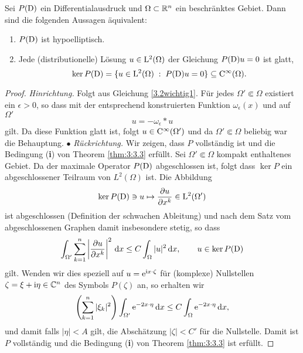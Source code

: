 %
%
%
%

\begin{thm}
Sei $P(\mathrm D)$ ein Differentialausdruck und $\Omega\subset\mathbb R^n$ ein beschränktes Gebiet. Dann sind die folgenden Aussagen äquivalent:
\begin{enumerate}
\item $P(\mathrm D)$ ist hypoelliptisch.
\item Jede (distributionelle) Lösung $u\in\mathrm L^2(\Omega)$ der Gleichung $P(\mathrm D)u=0$ ist glatt,
\begin{equation}
    \ker P(\mathrm D) = \{ u\in\mathrm L^2(\Omega) \;:\; P(\mathrm D)u=0\} \subseteq\mathrm C^\infty(\Omega).
\end{equation}
\end{enumerate}
\end{thm}
\begin{proof}
\emph{Hinrichtung.} Folgt aus Gleichung \eqref{3.2wichtig1}. Für jedes $\Omega'\Subset\Omega$ existiert ein $\epsilon>0$, so dass mit der entsprechend konstruierten Funktion $\omega_\epsilon(x)$ und auf $\Omega'$
\begin{equation}
 u = - \omega_\epsilon*u 
\end{equation}
gilt. Da diese Funktion glatt ist, folgt $u\in\mathrm C^\infty(\Omega')$ und da $\Omega'\Subset\Omega$ beliebig war die Behauptung. $\bullet$ \qquad
\emph{Rückrichtung.} Wir zeigen, dass $P$ vollständig ist und die Bedingung ({\bf i}) von Theorem \ref{thm:3:3.3} erfüllt.   Sei $\Omega'\Subset \Omega$ kompakt enthaltenes Gebiet. Da der maximale Operator $P(\mathrm D)$  abgeschlossen ist, folgt dass $\ker P$ ein abgeschlossener Teilraum von $L^2(\Omega)$ ist. Die Abbildung
\begin{equation}
\ker P(\mathrm D)\ni u \mapsto \frac{\partial u}{\partial x^k} \in \mathrm L^2(\Omega')
\end{equation}  
ist abgeschlossen (Definition der schwachen Ableitung) und nach dem Satz vom abgeschlossenen Graphen damit insbesondere stetig, so dass
\begin{equation}
\int_{\Omega'} \sum_{k=1}^n \left | \frac{\partial u}{\partial x^k}\right |^2\,\mathrm d x \le C \int_\Omega |u|^2\,\mathrm d x, \qquad u\in \ker P(\mathrm D)
\end{equation}
gilt. Wenden wir dies speziell auf $u=\mathrm e^{\mathrm i x\cdot \zeta}$ für (komplexe) Nullstellen $\zeta=\xi+\mathrm i\eta\in\mathbb C^n$ des Symbols $P(\zeta)$ an,  so erhalten wir
\begin{equation}
\left (\sum_{k=1}^n |\xi_k|^2 \right ) \int_{\Omega'} \mathrm e^{-2x\cdot \eta}\,\mathrm d x \le C\int_\Omega \mathrm e^{-2 x\cdot \eta}\,\mathrm d x,
\end{equation}
und damit falls  $|\eta|<A$ gilt, die Abschätzung $|\zeta|<C'$ für die Nullstelle. Damit ist $P$ vollständig und die Bedingung ({\bf i}) von Theorem \ref{thm:3:3.3} ist erfüllt. 
\end{proof}